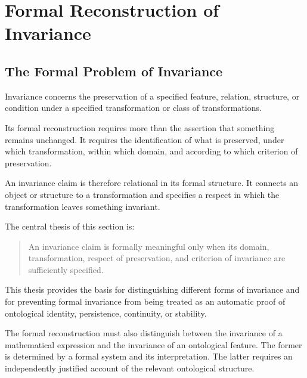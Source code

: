 
\section{Formal Reconstruction of Invariance}
\label{sec:formal-reconstruction-of-invariance}

\subsection{The Formal Problem of Invariance}

Invariance concerns the preservation of a specified
feature, relation, structure, or condition under a
specified transformation or class of transformations.

Its formal reconstruction requires more than the
assertion that something remains unchanged. It
requires the identification of what is preserved,
under which transformation, within which domain,
and according to which criterion of preservation.

An invariance claim is therefore relational in its
formal structure. It connects an object or structure
to a transformation and specifies a respect in
which the transformation leaves something invariant.

The central thesis of this section is:

\begin{quote}
An invariance claim is formally meaningful only when
its domain, transformation, respect of preservation,
and criterion of invariance are sufficiently
specified.
\end{quote}

This thesis provides the basis for distinguishing
different forms of invariance and for preventing
formal invariance from being treated as an automatic
proof of ontological identity, persistence, continuity,
or stability.

The formal reconstruction must also distinguish
between the invariance of a mathematical expression
and the invariance of an ontological feature. The
former is determined by a formal system and its
interpretation. The latter requires an independently
justified account of the relevant ontological
structure.

